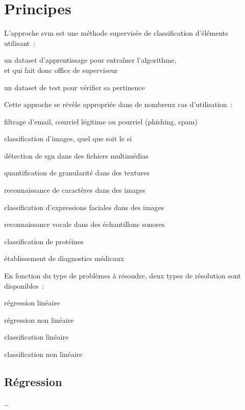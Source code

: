\section{Principes}

L’approche \gls{svm} est une méthode supervisée de classification d’éléments
utilisant :
\begin{enum}
\item{un \gls{dataset} d’apprentissage pour entraîner l’algorithme,\\
et qui fait donc office de superviseur}
\item{un \gls{dataset} de test pour vérifier sa pertinence}
\end{enum}

Cette approche se révèle appropriée dans de nombreux cas d’utilisation :
\begin{itmz}
\item{filtrage d’email, courriel légitime ou pourriel (phishing, spam)}
\item{classification d’images, quel que soit le \gls{si}}
\item{détection de \gls{sgn} dans des fichiers multimédias}
\item{quantification de granularité dans des textures}
\item{reconnaissance de caractères dans des images}
\item{classification d’expressions faciales dans des images}
\item{reconnaissance vocale dans des échantillons sonores}
\item{classification de protéines}
\item{établissement de diagnostics médicaux}
\end{itmz}

En fonction du type de problèmes à résoudre,
deux types de résolution sont disponibles :
\begin{itmz}
\item{régression linéaire}
\item{régression non linéaire}
\item{classification linéaire}
\item{classification non linéaire}
\end{itmz}

\subsection{Régression}

…


